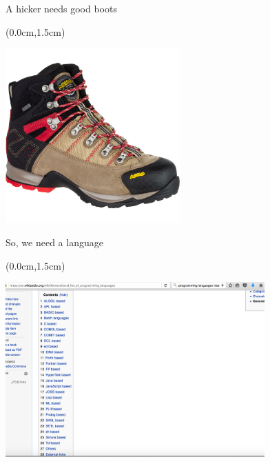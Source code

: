 \documentclass[xetex,14pt,aspectratio=169]{beamer}
\begin{document}
\begin{frame}{A hicker needs good boots}
\begin{textblock*}{\framewidth-0.8cm}(0.0cm,1.5cm) %
\begin{minipage}{\textwidth}
  \centering
  \includegraphics[height=6.7cm]{img/asolo}
\end{minipage}
\end{textblock*}
\end{frame}

\begin{frame}{So, we need a language}
\begin{textblock*}{\framewidth-0.8cm}(0.0cm,1.5cm) %
\begin{minipage}{\textwidth}
  \centering
  \includegraphics[height=6.7cm]{img/langs}
\end{minipage}
\end{textblock*}
\end{frame}
\end{document}
